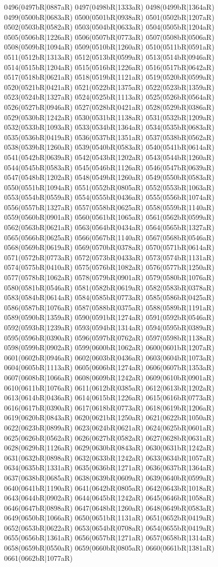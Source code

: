 0496(0497bR|0887aR) 0497(0498bR|1333aR) 0498(0499bR|1364aR) 0499(0500bR|0683aR) 0500(0501bR|0938aR) 0501(0502bR|1207aR) 0502(0503bR|0582aR) 0503(0504bR|0633aR) 0504(0505bR|1204aR) 0505(0506bR|1226aR) 0506(0507bR|0773aR) 0507(0508bR|0506aR) 0508(0509bR|1094aR) 0509(0510bR|1260aR) 0510(0511bR|0591aR) 0511(0512bR|1313aR) 0512(0513bR|0599aR) 0513(0514bR|0946aR) 0514(0515bR|1204aR) 0515(0516bR|1226aR) 0516(0517bR|0642aR) 0517(0518bR|0621aR) 0518(0519bR|1121aR) 0519(0520bR|0599aR) 0520(0521bR|0421aR) 0521(0522bR|1375aR) 0522(0523bR|1359aR) 0523(0524bR|1327aR) 0524(0525bR|1113aR) 0525(0526bR|0564aR) 0526(0527bR|0946aR) 0527(0528bR|0421aR) 0528(0529bR|0386aR) 0529(0530bR|1242aR) 0530(0531bR|1138aR) 0531(0532bR|1209aR) 0532(0533bR|1093aR) 0533(0534bR|1364aR) 0534(0535bR|0683aR) 0535(0536bR|0419aR) 0536(0537bR|1351aR) 0537(0538bR|0562aR) 0538(0539bR|1260aR) 0539(0540bR|0583aR) 0540(0541bR|0614aR) 0541(0542bR|0639aR) 0542(0543bR|1202aR) 0543(0544bR|1260aR) 0544(0545bR|0583aR) 0545(0546bR|1126aR) 0546(0547bR|0639aR) 0547(0548bR|1202aR) 0548(0549bR|1260aR) 0549(0550bR|0583aR) 0550(0551bR|1094aR) 0551(0552bR|0805aR) 0552(0553bR|1063aR) 0553(0554bR|0559aR) 0554(0555bR|0436aR) 0555(0556bR|1074aR) 0556(0557bR|1327aR) 0557(0558bR|0625aR) 0558(0559bR|1140aR) 0559(0560bR|0901aR) 0560(0561bR|1065aR) 0561(0562bR|0599aR) 0562(0563bR|0621aR) 0563(0564bR|0434aR) 0564(0565bR|1327aR) 0565(0566bR|0625aR) 0566(0567bR|1140aR) 0567(0568bR|0546aR) 0568(0569bR|0619aR) 0569(0570bR|0378aR) 0570(0571bR|0614aR) 0571(0572bR|0773aR) 0572(0573bR|0433aR) 0573(0574bR|1131aR) 0574(0575bR|0410aR) 0575(0576bR|1082aR) 0576(0577bR|1250aR) 0577(0578bR|1062aR) 0578(0579bR|0901aR) 0579(0580bR|1076aR) 0580(0581bR|0546aR) 0581(0582bR|0619aR) 0582(0583bR|0378aR) 0583(0584bR|0614aR) 0584(0585bR|0773aR) 0585(0586bR|0425aR) 0586(0587bR|1076aR) 0587(0588bR|0375aR) 0588(0589bR|1191aR) 0589(0590bR|1359aR) 0590(0591bR|1274aR) 0591(0592bR|0546aR) 0592(0593bR|1239aR) 0593(0594bR|1314aR) 0594(0595bR|0389aR) 0595(0596bR|0390aR) 0596(0597bR|0762aR) 0597(0598bR|1138aR) 0598(0599bR|0902aR) 0599(0600bR|1062aR) 0600(0601bR|1207aR) 0601(0602bR|0946aR) 0602(0603bR|0436aR) 0603(0604bR|1073aR) 0604(0605bR|1113aR) 0605(0606bR|1274aR) 0606(0607bR|1353aR) 0607(0608bR|1066aR) 0608(0609bR|1242aR) 0609(0610bR|0901aR) 0610(0611bR|1076aR) 0611(0612bR|0385aR) 0612(0613bR|1202aR) 0613(0614bR|0436aR) 0614(0615bR|1226aR) 0615(0616bR|0773aR) 0616(0617bR|0390aR) 0617(0618bR|0773aR) 0618(0619bR|1206aR) 0619(0620bR|0843aR) 0620(0621bR|1250aR) 0621(0622bR|1050aR) 0622(0623bR|0899aR) 0623(0624bR|0621aR) 0624(0625bR|0601aR) 0625(0626bR|0562aR) 0626(0627bR|0582aR) 0627(0628bR|0631aR) 0628(0629bR|1126aR) 0629(0630bR|0843aR) 0630(0631bR|1242aR) 0631(0632bR|0898aR) 0632(0633bR|1242aR) 0633(0634bR|1057aR) 0634(0635bR|1331aR) 0635(0636bR|1271aR) 0636(0637bR|1364aR) 0637(0638bR|0685aR) 0638(0639bR|0609aR) 0639(0640bR|0599aR) 0640(0641bR|1190aR) 0641(0642bR|0805aR) 0642(0643bR|1018aR) 0643(0644bR|0902aR) 0644(0645bR|1242aR) 0645(0646bR|1058aR) 0646(0647bR|0898aR) 0647(0648bR|1260aR) 0648(0649bR|0583aR) 0649(0650bR|1066aR) 0650(0651bR|1131aR) 0651(0652bR|0419aR) 0652(0653bR|0622aR) 0653(0654bR|0708aR) 0654(0655bR|0419aR) 0655(0656bR|1361aR) 0656(0657bR|1271aR) 0657(0658bR|1314aR) 0658(0659bR|0550aR) 0659(0660bR|0805aR) 0660(0661bR|1381aR) 0661(0662bR|1077aR) 